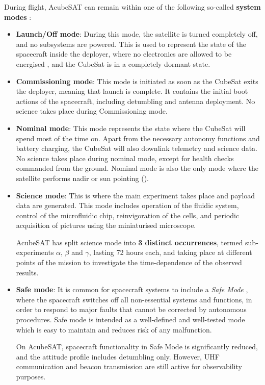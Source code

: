 \documentclass[a4paper,nobib]{tufte-book}
\begin{document}
During flight, AcubeSAT can remain within one of the following so-called \textbf{system modes} \autocite{MDO}:
\begin{itemize}
	\item \textbf{Launch/Off mode}: During this mode, the satellite is turned completely off, and no subsystems are powered. This is used to represent the state of the spacecraft inside the deployer, where no electronics are allowed to be energised \autocite[req. 3.3.3]{CDS13}, and the CubeSat is in a completely dormant state.
	
	\item \textbf{Commissioning mode}: This mode is initiated as soon as the CubeSat exits the deployer, meaning that launch is complete. It contains the initial boot actions of the spacecraft, including detumbling and antenna deployment. No science takes place during Commissioning mode.
	
	\item \textbf{Nominal mode}: This mode represents the state where the CubeSat will spend most of the time on. Apart from the necessary autonomy functions and battery charging, the CubeSat will also downlink telemetry and science data. No science takes place during nominal mode, except for health checks commanded from the ground. Nominal mode is also the only mode where the satellite performs nadir or sun pointing ().
	
	\item \textbf{Science mode}: This is where the main experiment takes place and payload data are generated. This mode includes operation of the fluidic system, control of the microfluidic chip, reinvigoration of the cells, and periodic acquisition of pictures using the miniaturised microscope.
	
	AcubeSAT has split science mode into \textbf{3 distinct occurrences}, termed sub-experiments \(\alpha\), \(\beta\) and \(\gamma\), lasting 72 hours each, and taking place at different points of the mission to investigate the time-dependence of the observed results.
	
	\item \textbf{Safe mode}: It is common for spacecraft systems to include a \emph{Safe Mode} \autocite[385]{aguirre_introduction_space_2013}, where the spacecraft switches off all non-essential systems and functions, in order to respond to major faults that cannot be corrected by autonomous procedures. Safe mode is intended as a well-defined and well-tested mode which is easy to maintain and reduces risk of any malfunction.
	
	On AcubeSAT, spacecraft functionality in Safe Mode is significantly reduced, and the attitude profile includes detumbling only. However, \ac{UHF} communication and beacon transmission are still active for observability purposes.
\end{itemize}
\end{document}
